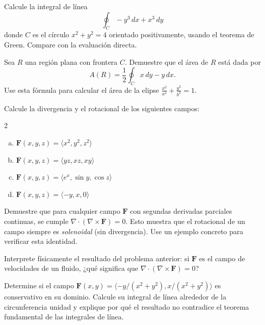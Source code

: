 \begin{prob}
Calcule la integral de línea
\[
\oint_C -y^3\,dx + x^3\,dy
\]
donde $C$ es el círculo $x^2+y^2=4$ orientado positivamente, usando
el teorema de Green. Compare con la evaluación directa.
\end{prob}

\begin{prob}
Sea $R$ una región plana con frontera $C$. Demuestre que el área de $R$
está dada por
\[
A(R) = \frac{1}{2} \oint_C x\,dy - y\,dx.
\]
Use esta fórmula para calcular el área de la elipse $\frac{x^2}{a^2}
+\frac{y^2}{b^2}=1$.
\end{prob}

\begin{prob}
Calcule la divergencia y el rotacional de los siguientes campos:
\begin{multicols}{2}
\begin{enumerate}[(a)]
    \item $\mathbf{F}(x,y,z)=\langle x^2, y^2, z^2 \rangle$
    \item $\mathbf{F}(x,y,z)=\langle yz, xz, xy \rangle$
    \item $\mathbf{F}(x,y,z)=\langle e^x, \sin y, \cos z \rangle$
    \item $\mathbf{F}(x,y,z)=\langle -y, x, 0 \rangle$
\end{enumerate}
\end{multicols}
\end{prob}

\begin{prob}
Demuestre que para cualquier campo $\mathbf{F}$ con segundas derivadas
parciales continuas, se cumple $\nabla \cdot (\nabla \times \mathbf{F})
= 0$. Esto muestra que el rotacional de un campo siempre es
\emph{solenoidal} (sin divergencia). Use un ejemplo concreto para
verificar esta identidad.
\end{prob}

\begin{prob}
Interprete físicamente el resultado del problema anterior:
si $\mathbf{F}$ es el campo de velocidades de un fluido, ¿qué significa
que $\nabla \cdot (\nabla \times \mathbf{F})=0$?
\end{prob}

\begin{prob}
Determine si el campo $\mathbf{F}(x,y) = \langle -y/(x^2+y^2),
x/(x^2+y^2) \rangle$ es conservativo en su dominio. Calcule su integral
de línea alrededor de la circunferencia unidad y explique por qué el
resultado no contradice el teorema fundamental de las integrales de
línea.
\end{prob}

